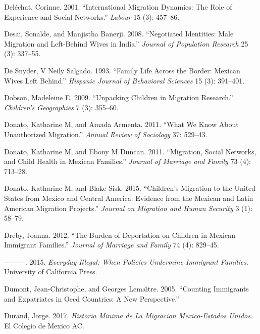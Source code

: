 \documentclass[
]{article}
\begin{document}
\leavevmode\hypertarget{ref-delechat2001international}{}%
Deléchat, Corinne. 2001. ``International Migration Dynamics: The Role of
Experience and Social Networks.'' \emph{Labour} 15 (3): 457--86.

\leavevmode\hypertarget{ref-desai2008negotiated}{}%
Desai, Sonalde, and Manjistha Banerji. 2008. ``Negotiated Identities:
Male Migration and Left-Behind Wives in India.'' \emph{Journal of
Population Research} 25 (3): 337--55.

\leavevmode\hypertarget{ref-de1993family}{}%
De Snyder, V Neily Salgado. 1993. ``Family Life Across the Border:
Mexican Wives Left Behind.'' \emph{Hispanic Journal of Behavioral
Sciences} 15 (3): 391--401.

\leavevmode\hypertarget{ref-dobson2009unpacking}{}%
Dobson, Madeleine E. 2009. ``Unpacking Children in Migration Research.''
\emph{Children's Geographies} 7 (3): 355--60.

\leavevmode\hypertarget{ref-donato2011we}{}%
Donato, Katharine M, and Amada Armenta. 2011. ``What We Know About
Unauthorized Migration.'' \emph{Annual Review of Sociology} 37: 529--43.

\leavevmode\hypertarget{ref-donato2011migration}{}%
Donato, Katharine M, and Ebony M Duncan. 2011. ``Migration, Social
Networks, and Child Health in Mexican Families.'' \emph{Journal of
Marriage and Family} 73 (4): 713--28.

\leavevmode\hypertarget{ref-donato2015children}{}%
Donato, Katharine M, and Blake Sisk. 2015. ``Children's Migration to the
United States from Mexico and Central America: Evidence from the Mexican
and Latin American Migration Projects.'' \emph{Journal on Migration and
Human Security} 3 (1): 58--79.

\leavevmode\hypertarget{ref-dreby2012burden}{}%
Dreby, Joanna. 2012. ``The Burden of Deportation on Children in Mexican
Immigrant Families.'' \emph{Journal of Marriage and Family} 74 (4):
829--45.

\leavevmode\hypertarget{ref-dreby2015everyday}{}%
---------. 2015. \emph{Everyday Illegal: When Policies Undermine
Immigrant Families}. University of California Press.

\leavevmode\hypertarget{ref-dumont2005counting}{}%
Dumont, Jean-Christophe, and Georges Lemaı̂tre. 2005. ``Counting
Immigrants and Expatriates in Oecd Countries: A New Perspective.''

\leavevmode\hypertarget{ref-durand2017}{}%
Durand, Jorge. 2017. \emph{Historia Minima de La Migracion
Mexico-Estados Unidos}. El Colegio de Mexico AC.
\end{document}

